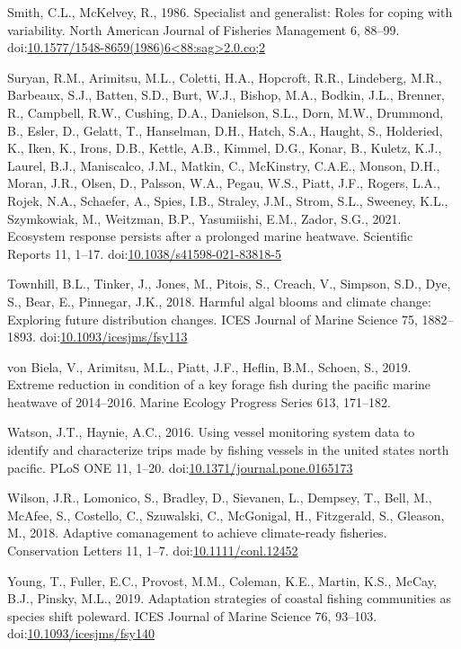 \documentclass[]{elsarticle} %
\begin{document}
\leavevmode\hypertarget{ref-Smith1986}{}%
Smith, C.L., McKelvey, R., 1986. Specialist and generalist: Roles for
coping with variability. North American Journal of Fisheries Management
6, 88--99.
doi:\href{https://doi.org/10.1577/1548-8659(1986)6\%3C88:sag\%3E2.0.co;2}{10.1577/1548-8659(1986)6\textless88:sag\textgreater2.0.co;2}

\leavevmode\hypertarget{ref-Suryan2021}{}%
Suryan, R.M., Arimitsu, M.L., Coletti, H.A., Hopcroft, R.R., Lindeberg,
M.R., Barbeaux, S.J., Batten, S.D., Burt, W.J., Bishop, M.A., Bodkin,
J.L., Brenner, R., Campbell, R.W., Cushing, D.A., Danielson, S.L., Dorn,
M.W., Drummond, B., Esler, D., Gelatt, T., Hanselman, D.H., Hatch, S.A.,
Haught, S., Holderied, K., Iken, K., Irons, D.B., Kettle, A.B., Kimmel,
D.G., Konar, B., Kuletz, K.J., Laurel, B.J., Maniscalco, J.M., Matkin,
C., McKinstry, C.A.E., Monson, D.H., Moran, J.R., Olsen, D., Palsson,
W.A., Pegau, W.S., Piatt, J.F., Rogers, L.A., Rojek, N.A., Schaefer, A.,
Spies, I.B., Straley, J.M., Strom, S.L., Sweeney, K.L., Szymkowiak, M.,
Weitzman, B.P., Yasumiishi, E.M., Zador, S.G., 2021. Ecosystem response
persists after a prolonged marine heatwave. Scientific Reports 11,
1--17.
doi:\href{https://doi.org/10.1038/s41598-021-83818-5}{10.1038/s41598-021-83818-5}

\leavevmode\hypertarget{ref-Townhill2018}{}%
Townhill, B.L., Tinker, J., Jones, M., Pitois, S., Creach, V., Simpson,
S.D., Dye, S., Bear, E., Pinnegar, J.K., 2018. Harmful algal blooms and
climate change: Exploring future distribution changes. ICES Journal of
Marine Science 75, 1882--1893.
doi:\href{https://doi.org/10.1093/icesjms/fsy113}{10.1093/icesjms/fsy113}

\leavevmode\hypertarget{ref-VonBiela2019}{}%
von Biela, V., Arimitsu, M.L., Piatt, J.F., Heflin, B.M., Schoen, S.,
2019. Extreme reduction in condition of a key forage fish during the
pacific marine heatwave of 2014--2016. Marine Ecology Progress Series
613, 171--182.

\leavevmode\hypertarget{ref-Watson2016a}{}%
Watson, J.T., Haynie, A.C., 2016. Using vessel monitoring system data to
identify and characterize trips made by fishing vessels in the united
states north pacific. PLoS ONE 11, 1--20.
doi:\href{https://doi.org/10.1371/journal.pone.0165173}{10.1371/journal.pone.0165173}

\leavevmode\hypertarget{ref-Wilson2018}{}%
Wilson, J.R., Lomonico, S., Bradley, D., Sievanen, L., Dempsey, T.,
Bell, M., McAfee, S., Costello, C., Szuwalski, C., McGonigal, H.,
Fitzgerald, S., Gleason, M., 2018. Adaptive comanagement to achieve
climate-ready fisheries. Conservation Letters 11, 1--7.
doi:\href{https://doi.org/10.1111/conl.12452}{10.1111/conl.12452}

\leavevmode\hypertarget{ref-Young2019}{}%
Young, T., Fuller, E.C., Provost, M.M., Coleman, K.E., Martin, K.S.,
McCay, B.J., Pinsky, M.L., 2019. Adaptation strategies of coastal
fishing communities as species shift poleward. ICES Journal of Marine
Science 76, 93--103.
doi:\href{https://doi.org/10.1093/icesjms/fsy140}{10.1093/icesjms/fsy140}
\end{document}
